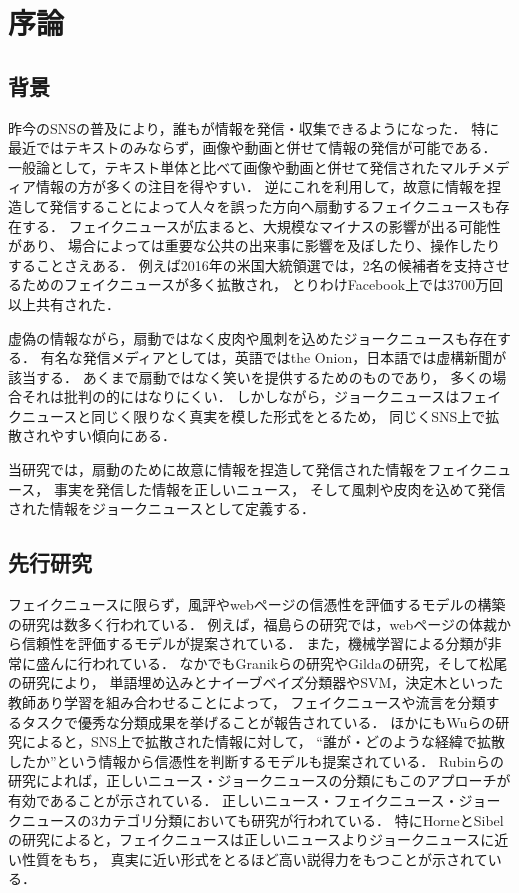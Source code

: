 \chapter{序論}
%
\section{背景}
昨今のSNSの普及により，誰もが情報を発信・収集できるようになった．
特に最近ではテキストのみならず，画像や動画と併せて情報の発信が可能である．
一般論として，テキスト単体と比べて画像や動画と併せて発信されたマルチメディア情報の方が多くの注目を得やすい．
逆にこれを利用して，故意に情報を捏造して発信することによって人々を誤った方向へ扇動するフェイクニュースも存在する．
フェイクニュースが広まると、大規模なマイナスの影響が出る可能性があり、
場合によっては重要な公共の出来事に影響を及ぼしたり、操作したりすることさえある．
例えば2016年の米国大統領選では，2名の候補者を支持させるためのフェイクニュースが多く拡散され，
とりわけFacebook上では3700万回以上共有された\cite{hun}．

虚偽の情報ながら，扇動ではなく皮肉や風刺を込めたジョークニュースも存在する．
有名な発信メディアとしては，英語ではthe Onion，日本語では虚構新聞が該当する．
あくまで扇動ではなく笑いを提供するためのものであり，
多くの場合それは批判の的にはなりにくい．
しかしながら，ジョークニュースはフェイクニュースと同じく限りなく真実を模した形式をとるため，
同じくSNS上で拡散されやすい傾向にある．

当研究では，扇動のために故意に情報を捏造して発信された情報をフェイクニュース，
事実を発信した情報を正しいニュース，
そして風刺や皮肉を込めて発信された情報をジョークニュースとして定義する．

\section{先行研究}
フェイクニュースに限らず，風評やwebページの信憑性を評価するモデルの構築の研究は数多く行われている．
例えば，福島らの研究\cite{fuk}では，webページの体裁から信頼性を評価するモデルが提案されている．
また，機械学習による分類が非常に盛んに行われている．
なかでもGranikらの研究\cite{gra}やGildaの研究\cite{gil}，そして松尾の研究\cite{mat}により，
単語埋め込みとナイーブベイズ分類器やSVM，決定木といった教師あり学習を組み合わせることによって，
フェイクニュースや流言を分類するタスクで優秀な分類成果を挙げることが報告されている．
ほかにもWuらの研究\cite{wu}によると，SNS上で拡散された情報に対して，
``誰が・どのような経緯で拡散したか''という情報から信憑性を判断するモデルも提案されている． 
Rubinらの研究\cite{rub}によれば，正しいニュース・ジョークニュースの分類にもこのアプローチが有効であることが示されている．
正しいニュース・フェイクニュース・ジョークニュースの3カテゴリ分類においても研究が行われている．
特にHorneとSibelの研究\cite{hor}によると，フェイクニュースは正しいニュースよりジョークニュースに近い性質をもち，
真実に近い形式をとるほど高い説得力をもつことが示されている．

